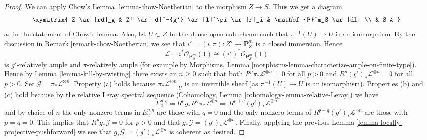 \begin{proof}
\medskip\noindent
We can apply Chow's Lemma \ref{lemma-chow-Noetherian}
to the morphism $Z \to S$. Thus we get a diagram
$$
\xymatrix{
Z \ar[rd]_g & Z' \ar[d]^-{g'} \ar[l]^\pi \ar[r]_i & \mathbf{P}^m_S \ar[dl] \\
& S &
}
$$
as in the statement of Chow's lemma. Also, let $U \subset Z$ be
the dense open subscheme such that $\pi^{-1}(U) \to U$ is an isomorphism.
By the discussion in Remark \ref{remark-chow-Noetherian} we see that
$i' = (i, \pi) : Z' \to \mathbf{P}^m_Z$ is
a closed immersion. Hence
$$
\mathcal{L} = i^*\mathcal{O}_{\mathbf{P}^m_S}(1) \cong
(i')^*\mathcal{O}_{\mathbf{P}^m_Z}(1)
$$
is $g'$-relatively ample and $\pi$-relatively ample (for example by
Morphisms, Lemma \ref{morphisms-lemma-characterize-ample-on-finite-type}).
Hence by Lemma \ref{lemma-kill-by-twisting}
there exists an $n \geq 0$ such that
both $R^p\pi_*\mathcal{L}^{\otimes n} = 0$ for all $p > 0$ and
$R^p(g')_*\mathcal{L}^{\otimes n} = 0$ for all $p > 0$.
Set $\mathcal{G} = \pi_*\mathcal{L}^{\otimes n}$.
Property (a) holds because $\pi_*\mathcal{L}^{\otimes n}|_U$ is
an invertible sheaf (as $\pi^{-1}(U) \to U$ is an isomorphism).
Properties (b) and (c) hold because by the relative Leray
spectral sequence
(Cohomology, Lemma \ref{cohomology-lemma-relative-Leray})
we have
$$
E_2^{p, q} = R^pg_* R^q\pi_*\mathcal{L}^{\otimes n}
\Rightarrow
R^{p + q}(g')_*\mathcal{L}^{\otimes n}
$$
and by choice of $n$ the only nonzero terms in $E_2^{p, q}$ are
those with $q = 0$ and the only nonzero terms of
$R^{p + q}(g')_*\mathcal{L}^{\otimes n}$ are those with $p = q = 0$.
This implies that $R^pg_*\mathcal{G} = 0$ for $p > 0$ and
that $g_*\mathcal{G} = (g')_*\mathcal{L}^{\otimes n}$.
Finally, applying the previous
Lemma \ref{lemma-locally-projective-pushforward}
we see that $g_*\mathcal{G} = (g')_*\mathcal{L}^{\otimes n}$ is
coherent as desired.
\end{proof}